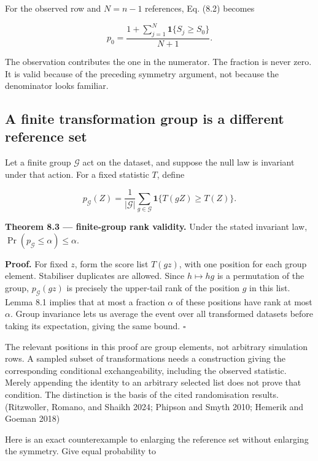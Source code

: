 \documentclass[
  11pt,
  a4paper]{article}
\begin{document}
For the observed row and \(N=n-1\) references, Eq. (8.2) becomes

\[
p_0=\frac{1+\sum_{j=1}^{N}\mathbf1\{S_j\ge S_0\}}{N+1}.
\tag{8.4}
\]

The observation contributes the one in the numerator. The fraction is never zero. It is valid because of the preceding symmetry argument, not because the denominator looks familiar.

\hypertarget{a-finite-transformation-group-is-a-different-reference-set}{%
\subsection{A finite transformation group is a different reference set}\label{a-finite-transformation-group-is-a-different-reference-set}}

Let a finite group \(\mathcal G\) act on the dataset, and suppose the null law is invariant under that action. For a fixed statistic \(T\), define

\[
p_{\mathcal G}(Z)=\frac1{|\mathcal G|}
\sum_{g\in\mathcal G}\mathbf1\{T(gZ)\ge T(Z)\}.
\tag{8.5}
\]

\textbf{Theorem 8.3 --- finite-group rank validity.} Under the stated invariant law, \(\Pr(p_{\mathcal G}\le\alpha)\le\alpha\).

\textbf{Proof.} For fixed \(z\), form the score list \(T(gz)\), with one position for each group element. Stabiliser duplicates are allowed. Since \(h\mapsto hg\) is a permutation of the group, \(p_{\mathcal G}(gz)\) is precisely the upper-tail rank of the position \(g\) in this list. Lemma 8.1 implies that at most a fraction \(\alpha\) of these positions have rank at most \(\alpha\). Group invariance lets us average the event over all transformed datasets before taking its expectation, giving the same bound. \(\square\)

The relevant positions in this proof are group elements, not arbitrary simulation rows. A sampled subset of transformations needs a construction giving the corresponding conditional exchangeability, including the observed statistic. Merely appending the identity to an arbitrary selected list does not prove that condition. The distinction is the basis of the cited randomisation results. (Ritzwoller, Romano, and Shaikh 2024; Phipson and Smyth 2010; Hemerik and Goeman 2018)

Here is an exact counterexample to enlarging the reference set without enlarging the symmetry. Give equal probability to
\end{document}
